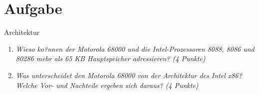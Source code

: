 \documentclass[10pt]{article}
\begin{document}
\section{Aufgabe}
Architektur
\begin{enumerate}[label=\alph*)]
	\item 
	\textit{Wieso ko?nnen der Motorola 68000 und die Intel-Prozessoren 8088, 8086 und 80286 mehr als 65 KB Hauptspeicher adressieren?
(4 Punkte)	}
	

	
	\item
	\textit{Was unterscheidet den Motorola 68000 von der Architektur des Intel x86? Welche Vor- und Nachteile ergeben sich daraus? (4 Punkte)}
\end{enumerate}
\newpage
\end{document}
